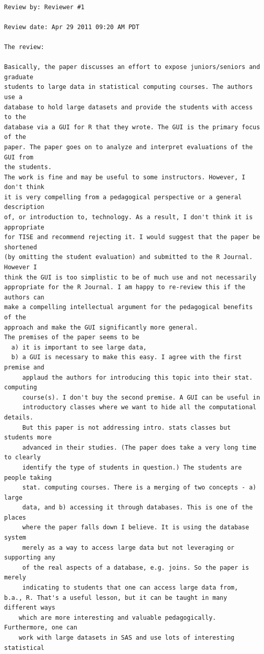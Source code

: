 \documentclass[11pt]{tise_style}
\begin{document}
\begin{verbatim}

Review by: Reviewer #1

Review date: Apr 29 2011 09:20 AM PDT

The review:

Basically, the paper discusses an effort to expose juniors/seniors and graduate
students to large data in statistical computing courses. The authors use a
database to hold large datasets and provide the students with access to the
database via a GUI for R that they wrote. The GUI is the primary focus of the
paper. The paper goes on to analyze and interpret evaluations of the GUI from
the students.
The work is fine and may be useful to some instructors. However, I don't think
it is very compelling from a pedagogical perspective or a general description
of, or introduction to, technology. As a result, I don't think it is appropriate
for TISE and recommend rejecting it. I would suggest that the paper be shortened
(by omitting the student evaluation) and submitted to the R Journal. However I
think the GUI is too simplistic to be of much use and not necessarily
appropriate for the R Journal. I am happy to re-review this if the authors can
make a compelling intellectual argument for the pedagogical benefits of the
approach and make the GUI significantly more general.
The premises of the paper seems to be
  a) it is important to see large data,
  b) a GUI is necessary to make this easy. I agree with the first premise and
     applaud the authors for introducing this topic into their stat. computing
     course(s). I don't buy the second premise. A GUI can be useful in
     introductory classes where we want to hide all the computational details.
     But this paper is not addressing intro. stats classes but students more
     advanced in their studies. (The paper does take a very long time to clearly
     identify the type of students in question.) The students are people taking
     stat. computing courses. There is a merging of two concepts - a) large
     data, and b) accessing it through databases. This is one of the places
     where the paper falls down I believe. It is using the database system
     merely as a way to access large data but not leveraging or supporting any
     of the real aspects of a database, e.g. joins. So the paper is merely
     indicating to students that one can access large data from,
b.a., R. That's a useful lesson, but it can be taught in many different ways
    which are more interesting and valuable pedagogically. Furthermore, one can
    work with large datasets in SAS and use lots of interesting statistical

\end{verbatim}
\end{document}
